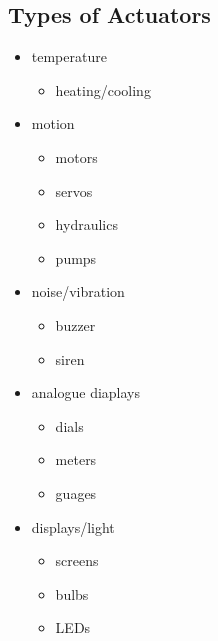 \documentclass[11pt]{article}
\begin{document}
\subsection{Types of Actuators}
\label{sec:orgc8d5420}
\begin{itemize}
\item temperature
\begin{itemize}
\item heating/cooling
\end{itemize}
\item motion
\begin{itemize}
\item motors
\item servos
\item hydraulics
\item pumps
\end{itemize}
\item noise/vibration
\begin{itemize}
\item buzzer
\item siren
\end{itemize}
\item analogue diaplays
\begin{itemize}
\item dials
\item meters
\item guages
\end{itemize}
\item displays/light
\begin{itemize}
\item screens
\item bulbs
\item LEDs
\end{itemize}
\end{itemize}
\end{document}
